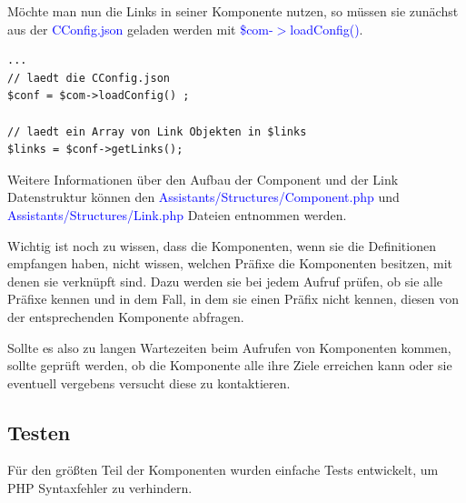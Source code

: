 \documentclass[10pt,a4paper,final,parskip]{scrartcl}
\newcommand{\blau}[1]{\textcolor{blue}{#1}}
\begin{document}
Möchte man nun die Links in seiner Komponente nutzen, so müssen sie zunächst aus der \blau{CConfig.json} geladen werden mit \blau{\$com-$>$loadConfig()}.

\begin{minipage}{\textwidth}
\begin{lstlisting}
...
// laedt die CConfig.json
$conf = $com->loadConfig() ;

// laedt ein Array von Link Objekten in $links
$links = $conf->getLinks(); 
\end{lstlisting}
\end{minipage}

Weitere Informationen über den Aufbau der Component und der Link Datenstruktur können den \blau{Assistants/Structures/Component.php} und \blau{Assistants/Structures/Link.php} Dateien entnommen werden.

Wichtig ist noch zu wissen, dass die Komponenten, wenn sie die Definitionen empfangen haben, nicht wissen, welchen Präfixe die Komponenten besitzen, mit denen sie verknüpft sind. Dazu werden sie bei jedem Aufruf prüfen, ob sie alle Präfixe kennen und in dem Fall, in dem sie einen Präfix nicht kennen, diesen von der entsprechenden Komponente abfragen.

Sollte es also zu langen Wartezeiten beim Aufrufen von Komponenten kommen, sollte geprüft werden, ob die Komponente alle ihre Ziele erreichen kann oder sie eventuell vergebens versucht diese zu kontaktieren.

 \subsection{Testen}
 Für den größten Teil der Komponenten wurden einfache Tests entwickelt, um PHP Syntaxfehler zu verhindern. 
 
\end{document}
